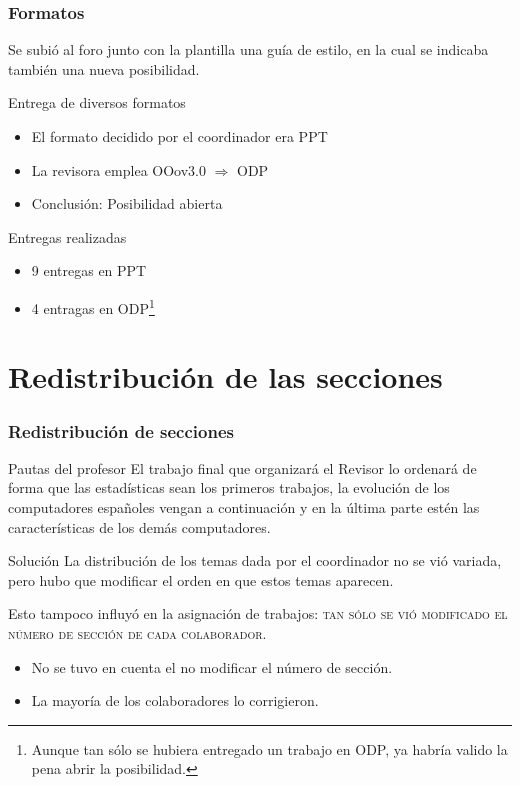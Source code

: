 \documentclass[9pt,xcolor=svgnames]{beamer}
\begin{document}
 \begin{frame}
  \frametitle{Formatos}

  \transdissolve
  
  \noindent Se subió al foro junto con la plantilla una guía de estilo, en 
  la cual se indicaba también una nueva posibilidad.
  
  \begin{block}{Entrega de diversos formatos}
  \begin{itemize}
    \item El formato decidido por el coordinador era PPT
    \item La revisora emplea OOov3.0 $\Longrightarrow$ ODP
    \item Conclusión: Posibilidad abierta
  \end{itemize}
  \end{block}
  
  \begin{block}{Entregas realizadas}
  \begin{itemize}
    \item 9 entregas en PPT
    \item 4 entragas en ODP\footnote{Aunque tan sólo se hubiera entregado
    un trabajo en ODP, ya habría valido la pena abrir la posibilidad.}
  \end{itemize}
  \end{block} 
 
  \end{frame}
  
  
  \section{Redistribución de las secciones}
    \transboxin
    
  \begin{frame}
   \frametitle{Redistribución de secciones}
 
    \begin{block}{Pautas del profesor}
     El trabajo final que organizará el Revisor lo ordenará de forma que las
     estadísticas sean los primeros trabajos, la evolución de los 
     computadores españoles vengan a continuación y en la última parte 
     estén las características de los demás computadores.
    \end{block}
  
  \begin{block}{Solución}
   La distribución de los temas dada por el coordinador no se vió variada, 
   pero hubo que modificar el orden en que estos temas aparecen.
  
   Esto tampoco influyó en la asignación de trabajos:
   \textsc{tan sólo se vió modificado el número de sección de cada 
   colaborador}.
  
   \begin{itemize}
     \item No se tuvo en cuenta el no modificar el número de sección.
     \item La mayoría de los colaboradores lo corrigieron.
   \end{itemize}
  \end{block}
  
  \end{frame}
 
\end{document}
